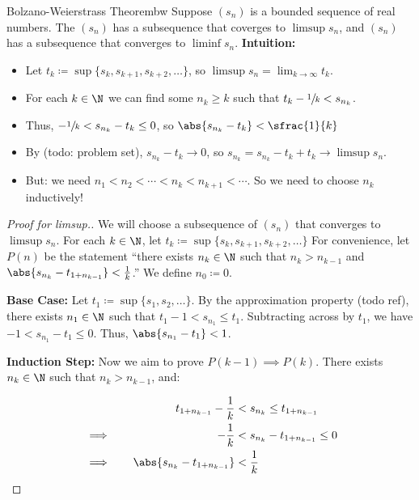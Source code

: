 \begin{thmbox}{Bolzano-Weierstrass Theorem}{bw}
    Suppose $(s_n)$ is a bounded sequence of real numbers. The $(s_n)$ has a subsequence that coverges to $\limsup s_n$, and $(s_n)$ has a subsequence that converges to $\liminf s_n$.
    \tcblower
    \textbf{Intuition:}
    \begin{itemize}[noitemsep]
        \item Let $t_k \coloneq \sup \{ s_k, s_{k+1}, s_{k+2}, \ldots\}$, so $\limsup s_n = \lim_{k \to \infty} t_k$.
        \item For each $k \in \N$ we can find some $n_k \geq k$ such that $t_k - \sfrac{1}{k} < s_{n_k}$.
        \item Thus, $-\sfrac{1}{k} < s_{n_k} - t_k \leq 0$, so $\abs{s_{n_k} - t_k} < \sfrac{1}{k}$
        \item By (todo: problem set), $s_{n_k} - t_k \to 0$, so $s_{n_k} = s_{n_k} - t_k + t_k \to \limsup s_n$.
        \item But: we need $n_1 < n_2 < \cdots < n_k < n_{k+1} < \cdots$. So we need to choose $n_k$ inductively!
    \end{itemize}
    \begin{proof}[Proof for limsup.]
        We will choose a subsequence of $(s_n)$ that converges to $\limsup s_n$. For each $k \in \N$, let $t_k \coloneq \sup \{ s_k, s_{k+1}, s_{k+2}, \ldots\}$ For convenience, let $P(n)$ be the statement ``there exists $n_k \in \N$ such that $n_k > n_{k-1}$ and $\abs{s_{n_k} - t_{1 + n_{k-1}}} < \frac{1}{k}$.'' We define $n_0 \coloneq 0$.

        \textbf{Base Case:} Let $t_1 \coloneq \sup \{s_1, s_2, \ldots\}$. By the approximation property (todo ref), there exists $n_1 \in \N$ such that $t_1 - 1 < s_{n_1} \leq t_1$. Subtracting across by $t_1$, we have $-1 < s_{n_1} - t_1 \leq 0$. Thus, $\abs{s_{n_1} - t_1} < 1$.

        \textbf{Induction Step:} Now we aim to prove $P(k-1) \implies P(k)$. There exists $n_k \in \N$ such that $n_k > n_{k-1}$, and:

        \begin{alignat*}{2}
            && t_{1 + n_{k-1}} - \frac{1}{k} &< s_{n_k} \leq t_{1+n_{k-1}} \\
            & \implies \quad & -\frac{1}{k} &< s_{n_k} - t_{1 + n_{k-1}} \leq 0 \\
            & \implies \quad & \abs{s_{n_k} - t_{1 + n_{k-1}}} &< \frac{1}{k}
        \end{alignat*}


\end{proof}
\end{thmbox}
